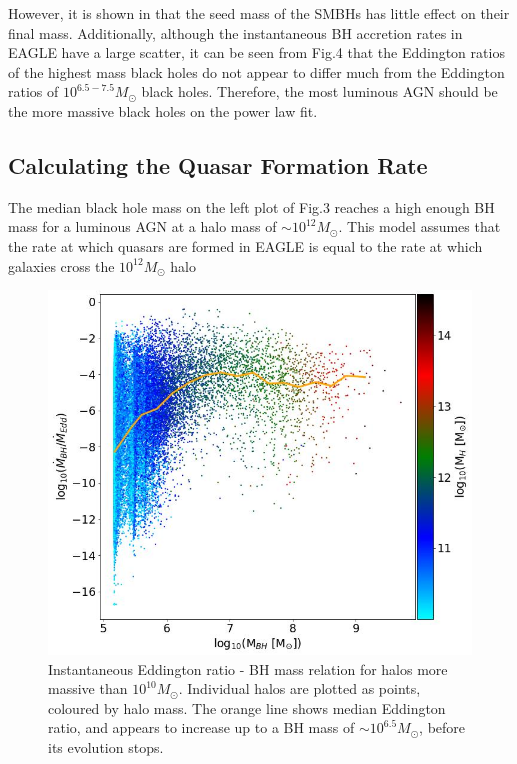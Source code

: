 \documentclass[12pt, twocolumn]{report}%
\begin{document}
 \noindent However, it is shown in \cite{Quasar} that the seed mass of the SMBHs has little effect on their final mass. Additionally, although the instantaneous BH accretion rates in EAGLE have a large scatter, it can be seen from Fig.4 that the Eddington ratios of the highest mass black holes do not appear to differ much from the Eddington ratios of $10^{6.5-7.5}M_\odot$ black holes. Therefore, the most luminous AGN should be the more massive black holes on the power law fit.\par

 \subsection{Calculating the Quasar Formation Rate}

The median black hole mass on the left plot of Fig.3 reaches a high enough BH mass for a luminous AGN at a halo mass of $\sim10^{12}M_\odot$. This model assumes that the rate at which quasars are formed in EAGLE is equal to the rate at which galaxies cross the $10^{12}M_\odot$ halo 

\begin{figure}[H]
\centering
\includegraphics[width=\linewidth]{Plot_12.jpeg}
\caption{Instantaneous Eddington ratio - BH mass relation for halos more massive than $10^{10}M_\odot$. Individual halos are plotted as points, coloured by halo mass. The orange line shows median Eddington ratio, and appears to increase up to a BH mass of $\sim10^{6.5}M_\odot$, before its evolution stops.}
\label{fig:4}
\end{figure}
\end{document}

